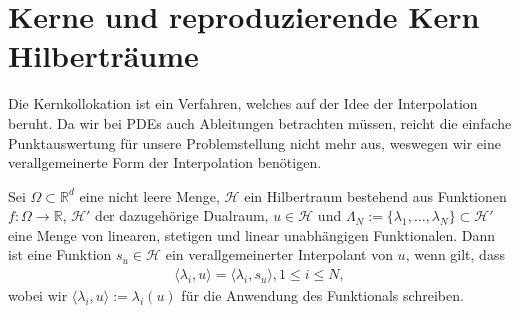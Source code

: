 \chapter{Kerne und reproduzierende Kern Hilberträume}
\label{cha:Grundlagen}

Die Kernkollokation ist ein Verfahren, welches auf der Idee der Interpolation beruht. Da wir bei \acp{PDE} auch Ableitungen betrachten müssen, reicht die einfache Punktauswertung für unsere Problemstellung nicht mehr aus, weswegen wir eine verallgemeinerte Form der Interpolation benötigen.

\begin{definition}
Sei $\Omega \subset \mathbb{R}^d$ eine nicht leere Menge, $\mathcal{H}$ ein Hilbertraum bestehend aus Funktionen $f:\Omega \rightarrow \mathbb{R}$, $\mathcal{H}'$ der dazugehörige Dualraum, $u \in \mathcal{H}$  und $\Lambda_N := \{\lambda_1, \dots, \lambda_N\} \subset \mathcal{H}'$ eine Menge von linearen, stetigen und linear unabhängigen Funktionalen. Dann ist eine Funktion $s_u \in \mathcal{H}$ ein verallgemeinerter Interpolant von $u$, wenn gilt, dass
\begin{align*}
\langle \lambda_i,u \rangle = \langle \lambda_i,s_u \rangle , 1\le i \le N,
\end{align*}
wobei wir $\langle \lambda_i, u \rangle := \lambda_i(u)$ für die Anwendung des Funktionals schreiben.
\end{definition}

